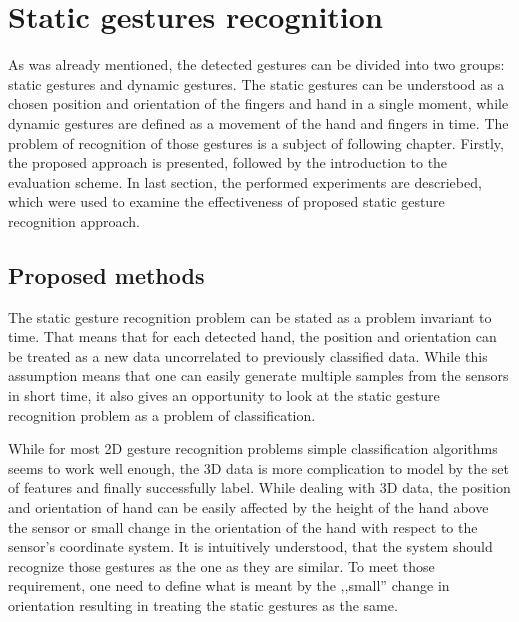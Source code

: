 
\chapter{Static gestures recognition}

As was already mentioned, the detected gestures can be divided into two groups: static gestures and dynamic gestures.
The static gestures can be understood as a chosen position and orientation of the fingers and hand in a single moment, while dynamic gestures are defined as a movement of the hand and fingers in time. 
The problem of recognition of those gestures is a subject of following chapter. 
Firstly, the proposed approach is presented, followed by the introduction to the evaluation scheme. 
In last section, the performed experiments are descriebed, which were used to examine the effectiveness of proposed static gesture recognition approach.

\section{Proposed methods}

The static gesture recognition problem can be stated as a problem invariant to time.
That means that for each detected hand, the position and orientation can be treated as a new data uncorrelated to previously classified data.
While this assumption means that one can easily generate multiple samples from the sensors in short time, it also gives an opportunity to look at the static gesture recognition problem as a problem of classification.

While for most 2D gesture recognition problems simple classification algorithms seems to work well enough, the 3D data is more complication to model by the set of features and finally successfully label.
While dealing with 3D data, the position and orientation of hand can be easily affected by the height of the hand above the sensor or small change in the orientation of the hand with respect to the sensor's coordinate system. 
It is intuitively understood, that the system should recognize those gestures as the one as they are similar.
To meet those requirement, one need to define what is meant by the ,,small'' change in orientation resulting in treating the static gestures as the same.

